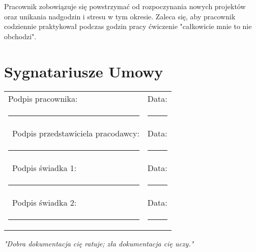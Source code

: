 \documentclass[a4paper,11pt]{article}
\begin{document}
Pracownik zobowiązuje się powstrzymać od rozpoczynania nowych projektów oraz unikania nadgodzin i stresu w tym okresie. Zaleca się, aby pracownik codziennie praktykował podczas godzin pracy ćwiczenie "całkowicie mnie to nie obchodzi".

\section*{Sygnatariusze Umowy}

\vspace{2em}
\noindent\begin{tabular}{@{}p{8cm}p{8cm}@{}}
Podpis pracownika: & Data: \\
\rule{8cm}{0.4pt} & \rule{8cm}{0.4pt} \\\
Podpis przedstawiciela pracodawcy: & Data: \\
\rule{8cm}{0.4pt} & \rule{8cm}{0.4pt} \\\
Podpis świadka 1: & Data: \\
\rule{8cm}{0.4pt} & \rule{8cm}{0.4pt} \\\
Podpis świadka 2: & Data: \\
\rule{8cm}{0.4pt} & \rule{8cm}{0.4pt}
\end{tabular}

\vfill

\begin{center}
    \textit{"Dobra dokumentacja cię ratuje; zła dokumentacja cię uczy."}
\end{center}
\end{document}
